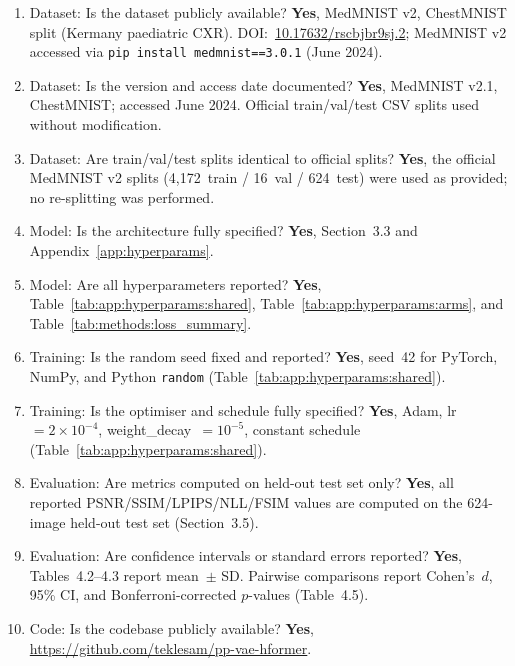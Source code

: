 \documentclass[12pt, a4paper, twoside, openright]{book}
\begin{document}
\begin{appendices}

\begin{enumerate}
  \item Dataset: Is the dataset publicly available? \textbf{Yes}, MedMNIST v2, ChestMNIST split (Kermany paediatric CXR). DOI:~\href{https://doi.org/10.17632/rscbjbr9sj.2}{10.17632/rscbjbr9sj.2}; MedMNIST v2 accessed via \texttt{pip install medmnist==3.0.1} (June 2024).
  \item Dataset: Is the version and access date documented? \textbf{Yes}, MedMNIST v2.1, ChestMNIST; accessed June 2024. Official train/val/test CSV splits used without modification.
  \item Dataset: Are train/val/test splits identical to official splits? \textbf{Yes}, the official MedMNIST v2 splits (4,172~train / 16~val / 624~test) were used as provided; no re-splitting was performed.
  \item Model: Is the architecture fully specified? \textbf{Yes}, Section~3.3 and Appendix~\ref{app:hyperparams}.
  \item Model: Are all hyperparameters reported? \textbf{Yes}, Table~\ref{tab:app:hyperparams:shared}, Table~\ref{tab:app:hyperparams:arms}, and Table~\ref{tab:methods:loss_summary}.
  \item Training: Is the random seed fixed and reported? \textbf{Yes}, seed~42 for PyTorch, NumPy, and Python \texttt{random} (Table~\ref{tab:app:hyperparams:shared}).
  \item Training: Is the optimiser and schedule fully specified? \textbf{Yes}, Adam, lr~$=2\times10^{-4}$, weight\_decay~$=10^{-5}$, constant schedule (Table~\ref{tab:app:hyperparams:shared}).
  \item Evaluation: Are metrics computed on held-out test set only? \textbf{Yes}, all reported PSNR/SSIM/LPIPS/NLL/FSIM values are computed on the 624-image held-out test set (Section~3.5).
  \item Evaluation: Are confidence intervals or standard errors reported? \textbf{Yes}, Tables~4.2--4.3 report mean~$\pm$ SD. Pairwise comparisons report Cohen's~$d$, 95\% CI, and Bonferroni-corrected $p$-values (Table~4.5).
  \item Code: Is the codebase publicly available? \textbf{Yes}, \url{https://github.com/teklesam/pp-vae-hformer}.
\end{enumerate}


\end{appendices}
\end{document}
